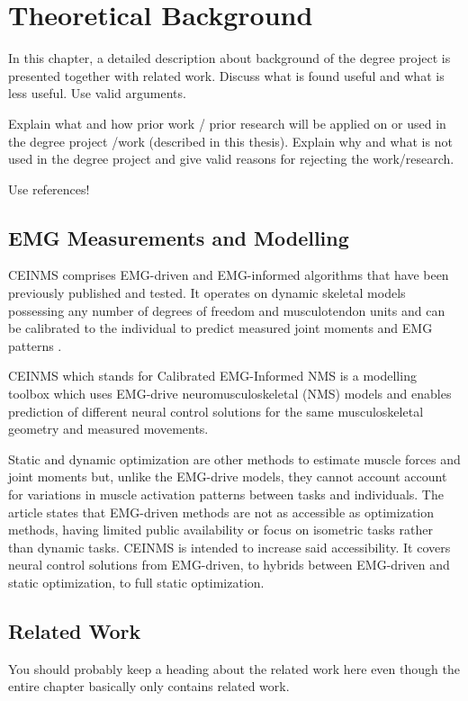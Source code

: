 \section{Theoretical Background}
In this chapter, a detailed description about background of the degree project is presented together with related work. Discuss what is found useful and what is less useful. Use valid arguments. 

Explain what and how prior work / prior research will be applied on or used in the degree project /work (described in this thesis). Explain why and what is not used in the degree project and give valid reasons for rejecting the work/research.

Use references!

\subsection{EMG Measurements and Modelling}

CEINMS comprises EMG-driven and EMG-informed algorithms that have been previously published and tested. 
It operates on dynamic skeletal models possessing any number of degrees of freedom and musculotendon units and can be calibrated to the individual to predict measured joint moments and EMG patterns \cite{Pizzolato2015}.

CEINMS which stands for Calibrated EMG-Informed NMS is a modelling toolbox which uses EMG-drive neuromusculoskeletal (NMS) models and enables prediction of different neural control solutions for the same musculoskeletal geometry and measured movements. 

Static and dynamic optimization are other methods to estimate muscle forces and joint moments but, unlike the EMG-drive models, they cannot account account for variations in muscle activation patterns between tasks and individuals.
The article states that EMG-driven methods are not as accessible as optimization methods, having limited public availability or focus on isometric tasks rather than dynamic tasks. 
CEINMS is intended to increase said accessibility. 
It covers neural control solutions from EMG-driven, to hybrids between EMG-driven and static optimization, to full static optimization.


\subsection{Related Work}
You should probably keep a heading about the related work here even though the entire chapter basically only contains related work.
